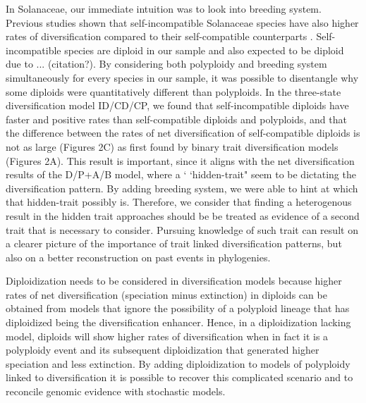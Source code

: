 In Solanaceae, our immediate intuition was to look into breeding system.
Previous studies shown that self-incompatible Solanaceae species have also higher rates of diversification compared to their self-compatible counterparts \citep{goldberg_2012}.
Self-incompatible species are diploid in our sample and also expected to be diploid due to ... (citation?).
By considering both polyploidy and breeding system simultaneously for every species in our sample, it was possible to disentangle why some diploids were quantitatively different than polyploids.
In the three-state diversification model ID/CD/CP, we found that self-incompatible diploids have faster and positive rates than self-compatible diploids and polyploids, and that the difference between the  rates of net diversification of self-compatible diploids is not as large (Figures 2C) as first found by binary trait diversification models (Figures 2A).
This result is important, since it aligns with the net diversification results of the  D/P+A/B model, where a `	`hidden-trait" seem to be dictating the diversification pattern.
By adding breeding system, we were able to hint at which that hidden-trait possibly is.
Therefore, we consider that finding a heterogenous result in the hidden trait approaches should be be treated as evidence of a second trait that is necessary to consider.
Pursuing knowledge of  such trait can result on a clearer picture of the importance of trait linked diversification patterns, but also on a better reconstruction on past events in phylogenies.







Diploidization needs to be considered in diversification models because higher rates of net diversification (speciation minus extinction) in diploids can be obtained from models that ignore the possibility of a polyploid lineage that has diploidized being the diversification enhancer. Hence, in a diploidization lacking model, diploids will show higher rates of diversification when in fact it is a polyploidy event and its subsequent diploidization that generated higher speciation and less extinction.  By adding diploidization to models of polyploidy linked to diversification it is possible to recover this complicated scenario and to reconcile genomic evidence with stochastic models. 

